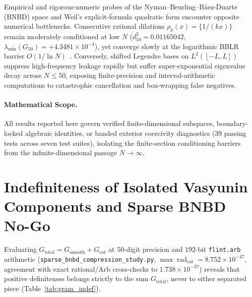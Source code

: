 \documentclass[11pt,a4paper]{article}
\theoremstyle{definition}
\begin{document}
Empirical and rigorous-numeric probes of the Nyman--Beurling--B\'aez-Duarte (BNBD) space and Weil's explicit-formula quadratic form encounter opposite numerical bottlenecks. Consecutive rational dilations $\rho_k(x) = \{1/(kx)\}$ remain moderately conditioned at low $N$ ($d_{50}^2 = 0.01165042$, $\lambda_{\min}(G_{50}) = +4.3481 \times 10^{-4}$), yet converge slowly at the logarithmic BBLR barrier $O(1/\ln N)$~\cite{BaezDuarte2000}. Conversely, shifted Legendre bases on $L^2([-L, L])$ suppress high-frequency leakage rapidly but suffer super-exponential eigenvalue decay across $N \le 50$, exposing finite-precision and interval-arithmetic computations to catastrophic cancellation and box-wrapping false negatives.

\paragraph{Mathematical Scope.}
All results reported here govern verified finite-dimensional subspaces, boundary-locked algebraic identities, or banded exterior coercivity diagnostics ($39$ passing tests across seven test suites), isolating the finite-section conditioning barriers from the infinite-dimensional passage $N \to \infty$.

\section{Indefiniteness of Isolated Vasyunin Components and Sparse BNBD No-Go}\label{sec:sparse_bnbd}

Evaluating $G_{\mathrm{total}} = G_{\mathrm{smooth}} + G_{\mathrm{cot}}$ at $50$-digit precision and $192$-bit \texttt{flint.arb} arithmetic (\texttt{sparse\_\allowbreak bnbd\_\allowbreak compression\_\allowbreak study.py}, $\max \operatorname{rad}_{\mathrm{cot}} = 8.752 \times 10^{-47}$, agreement with exact rational/Arb cross-checks to $1.738 \times 10^{-57}$) reveals that positive definiteness belongs strictly to the sum $G_{\mathrm{total}}$, never to either separated piece (Table~\ref{tab:gram_indef}).
\end{document}
